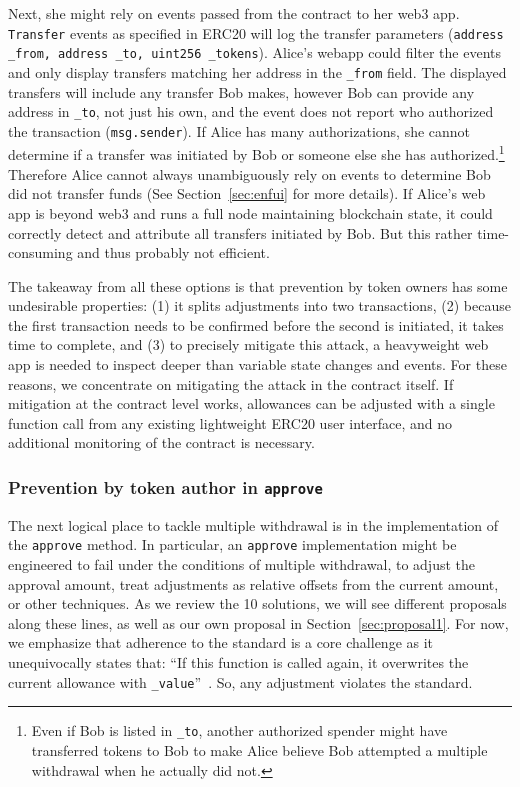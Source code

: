 Next, she might rely on events passed from the contract to her web3 app. \texttt{Transfer} events as specified in ERC20 will log the transfer parameters (\ie  \texttt{address \_from, address \_to, uint256 \_tokens}). Alice's webapp could filter the events and only display transfers matching her address in the \texttt{\_from} field. The displayed transfers will include any transfer Bob makes, however Bob can provide any address in \texttt{\_to}, not just his own, and the event does not report who authorized the transaction (\ie \texttt{msg.sender}). If Alice has many authorizations, she cannot determine if a transfer was initiated by Bob or someone else she has authorized.\footnote{Even if Bob is listed in \texttt{\_to}, another authorized spender might have transferred tokens to Bob to make Alice believe Bob attempted a multiple withdrawal when he actually did not.} Therefore Alice cannot always unambiguously rely on events to determine Bob did not transfer funds (See Section~\ref{sec:enfui} for more details). If Alice's web app is beyond web3 and runs a full node maintaining blockchain state, it could correctly detect and attribute all transfers initiated by Bob. But this rather time-consuming and thus probably not efficient.

The takeaway from all these options is that prevention by token owners has some undesirable properties: (1) it splits adjustments into two transactions, (2) because the first transaction needs to be confirmed before the second is initiated, it takes time to complete, and (3) to precisely mitigate this attack, a heavyweight web app is needed to inspect deeper than variable state changes and events. For these reasons, we concentrate on mitigating the attack in the contract itself. If mitigation at the contract level works, allowances can be adjusted with a single function call from any existing lightweight ERC20 user interface, and no additional monitoring of the contract is necessary. 

	
\subsubsection*{Prevention by token author in \texttt{approve}} The next logical place to tackle multiple withdrawal is in the implementation of the \texttt{approve} method. In particular, an \texttt{approve} implementation might be engineered to fail under the conditions of multiple withdrawal, to adjust the approval amount, treat adjustments as relative offsets from the current amount, or other techniques. As we review the 10 solutions, we will see different proposals along these lines, as well as our own proposal in Section~\ref{sec:proposal1}. For now, we emphasize that adherence to the standard is a core challenge as it unequivocally states that: ``If this function is called again, it overwrites the current allowance with \texttt{\_value}''~\cite{Ref08}. So, any adjustment violates the standard.


